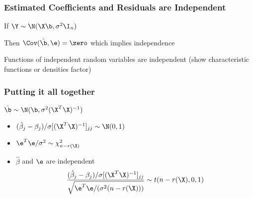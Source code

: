 \documentclass{beamer}
\begin{document}
\begin{frame}
  \frametitle{ Estimated Coefficients and Residuals are Independent}
If  $\Y \sim \N(\X\b, \sigma^2 \I_n)$

Then $\Cov(\hat{\b}, \e) = \zero$ which implies independence 
\vfill

Functions of independent random variables are independent
(show characteristic functions or densities factor)
\end{frame}

\begin{frame}\frametitle{Putting it all together}
$\hat{\b} \sim \N(\b, \sigma^2 (\X^T\X)^{-1})$
  \begin{itemize}
  \item $(\hat{\beta}_j - \beta_j)/ \sigma [(\X^T\X)^{-1}]_{jj} \sim
    \N(0,1)$
\item $\e^T\e/ \sigma^2 \sim \chi^2_{n - r(\X)}$
\item $\hat{\beta}$ and $\e$ are independent
$$ \frac{(\hat{\beta}_j - \beta_j)/ \sigma [(\X^T\X)^{-1}]_{jj}}
{\sqrt{\e^T\e/ ( \sigma^2 (n - r(\X)))}} \sim t(n - r(\X), 0, 1)$$
  \end{itemize}
\end{frame}
\end{document}
